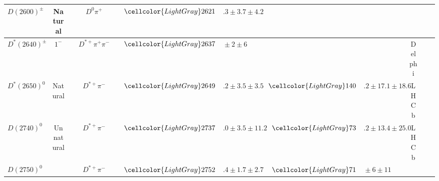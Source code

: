 \begin{adjustbox}{width=0.76\textwidth,center}
{\begin{tabular}{cp{5pt}cp{5pt}cp{5pt}r@{}lp{5pt}r@{}lp{5pt}cp{5pt}c}
		\multirow{1}{*}{$D(2600)^{\pm}$}         &                  & \multirow{1}{*}{Natural}     &                  & $D^{0}\pi^{+}$                  & \cellcolor{LightGray} & $	\cellcolor{LightGray}2621$  & \cellcolor{LightGray}$.3\pm3.7\pm4.2	$        & \cellcolor{LightGray} & \cellcolor{LightGray}                            & \cellcolor{LightGray}                        & \cellcolor{LightGray} & \cellcolor{LightGray} \babar{}                                & \cellcolor{LightGray} & \cite{delAmoSanchez:2010vq}               \\ \midrule
		\multirow{1}{*}{$D^{*}(2640)^{\pm}$}     &                  & \multirow{1}{*}{$1^{-}$}     &                  & $D^{*+}\pi^{+}\pi^{-}$          & \cellcolor{LightGray} & $	\cellcolor{LightGray}2637$  & \cellcolor{LightGray}${}\pm2\pm6	$             & \cellcolor{LightGray} & \cellcolor{LightGray}                            & \cellcolor{LightGray}                        & \cellcolor{LightGray} & \cellcolor{LightGray} Delphi                                  & \cellcolor{LightGray} & \cite{Abreu:1998vk}                       \\ \midrule
		\multirow{1}{*}{$D^{*}(2650)^{0}$}       &                  & \multirow{1}{*}{Natural}     &                  & $D^{*+}\pi^{-}$                 & \cellcolor{LightGray} & $	\cellcolor{LightGray}2649$  & \cellcolor{LightGray}$.2\pm3.5\pm3.5	$        & \cellcolor{LightGray} & \cellcolor{LightGray}$	\cellcolor{LightGray}140$ & \cellcolor{LightGray}$.2\pm17.1\pm18.6	$     & \cellcolor{LightGray} & \cellcolor{LightGray} LHCb                                    & \cellcolor{LightGray} & \cite{Aaij:2013sza}                       \\ \midrule
		\multirow{1}{*}{$D(2740)^{0}$}           &                  & \multirow{1}{*}{Unnatural}   &                  & $D^{*+}\pi^{-}$                 & \cellcolor{LightGray} & $	\cellcolor{LightGray} 2737$ & \cellcolor{LightGray}$.0\pm3.5\pm11.2	$       & \cellcolor{LightGray} & \cellcolor{LightGray}$	\cellcolor{LightGray} 73$ & \cellcolor{LightGray}$.2\pm13.4\pm25.0	$     & \cellcolor{LightGray} & \cellcolor{LightGray} LHCb                                    & \cellcolor{LightGray} & \cite{Aaij:2013sza}                       \\ \midrule
		\multirow{1}{*}{$D(2750)^{0}$}           &                  & \multirow{1}{*}{}            &                  & $D^{*+}\pi^{-}$                 & \cellcolor{LightGray} & $	\cellcolor{LightGray} 2752$ & \cellcolor{LightGray}$.4\pm1.7\pm2.7	$        & \cellcolor{LightGray} & \cellcolor{LightGray}$	\cellcolor{LightGray} 71$ & \cellcolor{LightGray}${}\pm6\pm11	$          & \cellcolor{LightGray} & \cellcolor{LightGray} \babar{}                                & \cellcolor{LightGray} & \cite{delAmoSanchez:2010vq}               \\ \midrule

\end{tabular}}
\end{adjustbox}
